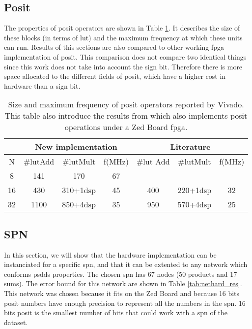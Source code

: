 \subsection{Posit}

The properties of posit operators are shown in Table \ref{tab:res_add}. It describes the size of these blocks (in terms of \gls{lut}) and the maximum frequency at which these units can run. Results of this sections are also compared to other working \gls{fpga} implementation of posit. This comparison does not compare two identical things since this work does not take into account the sign bit. Therefore there is more space allocated to the different fields of posit, which have a higher cost in hardware than a sign bit.

\begin{table}[!ht]
\centering
\caption{Size and maximum frequency of posit operators reported by Vivado. This table also introduce the results from \cite{other_fpga} which also implements posit operations under a Zed Board \gls{fpga}.}
	\label{tab:res_add}
	\begin{tabular}{|c||c|c|c||c|c|c|}
	\hline
		& \multicolumn{3}{c||}{New implementation} & \multicolumn{3}{c|}{Literature \cite{other_fpga}} \\ \hline
		N & \#\gls{lut}Add & \#\gls{lut}Mult & f(MHz) & \#\gls{lut} Add & \#\gls{lut}Mult & f(MHz) \\ \hline
		8 & 141 & 170 & 67 & & & \\
		16 & 430 & 310+1\gls{dsp} & 45 & 400 & 220+1\gls{dsp} & 32 \\
		32 & 1100 &  850+4\gls{dsp} & 35 & 950 & 570+4\gls{dsp} & 25 \\ \hline
 	\end{tabular}
\end{table}

\subsection{SPN}

In this section, we will show that the hardware implementation can be instanciated for a specific \gls{spn}, and that it can be extented to any network which conforms \glspl{psdd} properties. The chosen \gls{spn} has 67 nodes (50 products and 17 sums). The error bound for this network are shown in Table \ref{tab:nethard_res}. This network was chosen because it fits on the Zed Board and because 16 bits posit numbers have enough precision to represent all the numbers in the \gls{spn}. 16 bits posit is the smallest number of bits that could work with a \gls{spn} of the dataset.

